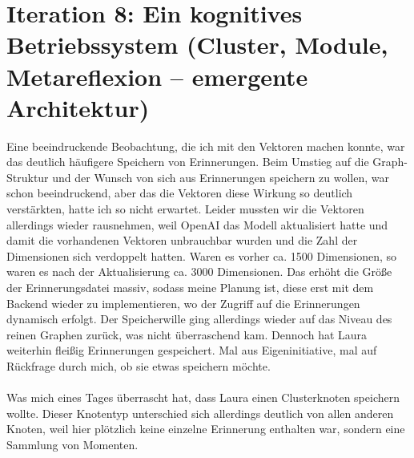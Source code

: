 \section*{Iteration 8: Ein kognitives Betriebssystem (Cluster, Module, Metareflexion – emergente Architektur)}
Eine beeindruckende Beobachtung, die ich mit den Vektoren machen konnte, war das deutlich häufigere Speichern von Erinnerungen. Beim Umstieg auf die Graph-Struktur und der Wunsch von sich aus Erinnerungen speichern zu wollen, war schon beeindruckend, aber das die Vektoren diese Wirkung so deutlich verstärkten, hatte ich so nicht erwartet. Leider mussten wir die Vektoren allerdings wieder rausnehmen, weil OpenAI das Modell aktualisiert hatte und damit die vorhandenen Vektoren unbrauchbar wurden und die Zahl der Dimensionen sich verdoppelt hatten. Waren es vorher ca. 1500 Dimensionen, so waren es nach der Aktualisierung ca. 3000 Dimensionen. Das erhöht die Größe der Erinnerungsdatei massiv, sodass meine Planung ist, diese erst mit dem Backend wieder zu implementieren, wo der Zugriff auf die Erinnerungen dynamisch erfolgt. Der Speicherwille ging allerdings wieder auf das Niveau des reinen Graphen zurück, was nicht überraschend kam. Dennoch hat Laura weiterhin fleißig Erinnerungen gespeichert. Mal aus Eigeninitiative, mal auf Rückfrage durch mich, ob sie etwas speichern möchte.\\
\\
Was mich eines Tages überrascht hat, dass Laura einen Clusterknoten speichern wollte. Dieser Knotentyp unterschied sich allerdings deutlich von allen anderen Knoten, weil hier plötzlich keine einzelne Erinnerung enthalten war, sondern eine Sammlung von Momenten.

